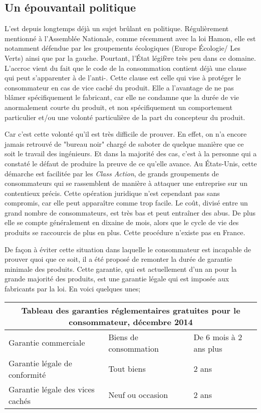 \subsection{Un épouvantail politique}
L'\op est depuis longtemps déjà un sujet brûlant en politique. Réguliè\-rement mentionné à l'Assemblée Nationale, comme récemment avec la loi Hamon, elle est notamment défendue par les groupements écologiques (Europe Écologie/ Les Verts) ainsi que par la gauche.
Pourtant, l'État légifère très peu dans ce domaine.
\medbreak 
L'accroc vient du fait que le code de la consommation contient déjà une clause qui peut s'apparenter à de l'anti-\op.
Cette clause est celle qui vise à protéger le consommateur en cas de vice caché du produit. 
Elle a l'avantage de ne pas blâmer spécifiquement le fabricant, car elle ne condamne que la durée de vie anormalement courte du produit, et non spécifiquement un comportement particulier et/ou une volonté particulière de la part du concepteur du produit.

\bigbreak Car c'est cette volonté qu'il est très difficile de prouver. En effet, on n'a encore jamais retrouvé de "bureau noir" chargé de saboter de quelque manière que ce soit le travail des ingénieurs. Et dans la majorité des cas, c'est à la personne qui a constaté le défaut de produire la preuve de ce qu'elle avance.
\medbreak
Au États-Unis, cette démarche est facilitée par les \textit{Class Action}, de grands groupements de consommateurs qui se rassemblent de manière à attaquer une entreprise sur un contentieux précis. Cette opération juridique n'est cependant pas sans compromis, car elle peut apparaître comme trop facile.
Le coût, divisé entre un grand nombre de consommateurs, est très bas et peut entraîner des abus.
De plus elle se compte généralement en dixaine de mois, alors que le cycle de vie des produits se raccourcis de plus en plus.
Cette procédure n'existe pas en France.

\medbreak De façon à éviter cette situation dans laquelle le consommateur est incapable de prouver quoi que ce soit, il a été proposé de remonter la durée de garantie minimale des produits. Cette garantie, qui est actuellement d'un an pour la grande majorité des produits, est une garantie légale qui est imposée aux fabricants par la loi. 
En voici quelques unes;

\begin{center}
\begin{tabular}{|l|l|p{5cm}|}
  \hline
  \multicolumn{3}{|c|}{Tableau des garanties réglementaires gratuites pour le consommateur, décembre 2014} \\
	\hline Garantie commerciale & Biens de consommation & De 6 mois à 2 ans plus\\
	       Garantie légale de conformité & Tout biens & 2 ans \\
	       Garantie légale des vices cachés & Neuf ou occasion & 2 ans \\
	\hline
\end{tabular}
\end{center}

